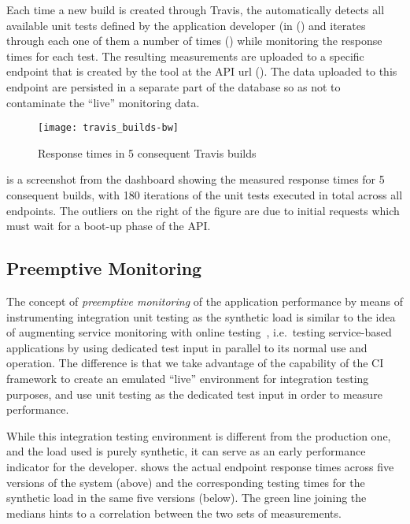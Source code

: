   Each time a new build is created through Travis, the \tool automatically detects all available unit tests defined by the application developer (in () and iterates through each one of them a number of times () while monitoring the response times for each test. The resulting measurements are uploaded to a specific endpoint that is created by the tool at the API url (). The data uploaded to this endpoint are persisted in a separate part of the \tool database so as not to contaminate the ``live'' monitoring data. 

      \begin{figure}[h!]
        \centering
        \texttt{[image: travis\_builds-bw]}
        \caption{Response times in 5 consequent Travis builds}
        \label{fig:builds}
      \end{figure}

   is a screenshot from the dashboard showing the measured response times for 5 consequent builds, with 180 iterations of the unit tests executed in total across all endpoints. The outliers on the right of the figure are due to initial requests which must wait for a boot-up phase of the API.
  


  \subsection*{Preemptive Monitoring}
  The concept of {\em preemptive monitoring} of the application performance by means of instrumenting integration unit testing as the synthetic load is similar to the idea of augmenting service monitoring with online testing~\cite{metzger2010proactive}, i.e.~testing service-based applications by using dedicated test input in parallel to its normal use and operation. The difference is that we take advantage of the capability of the CI framework to create an emulated ``live'' environment for integration testing purposes, and use unit testing as the dedicated test input in order to measure performance. 
  
  While this integration testing environment is different from the production one, and the load used is purely synthetic, it can serve as an early performance indicator for the developer.   shows the actual endpoint response times across five versions of the system (above) and the corresponding testing times for the synthetic load in the same five versions (below). The green line joining the medians hints to a correlation between the two sets of measurements. 

